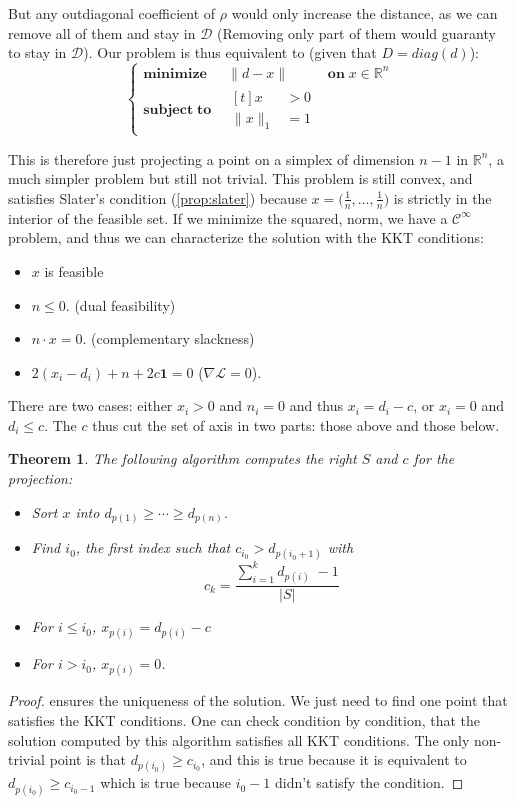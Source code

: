 \documentclass[10pt]{report}
\theoremstyle{plain}
\newtheorem{thm}{Theorem}[chapter]
\theoremstyle{definition}
\theoremstyle{remark}
\newcommand{\R}{\ensuremath{\mathbb{R}}}
\renewcommand{\geq}{\geqslant}
\renewcommand{\leq}{\leqslant}
\newcommand{\class}[1]{{\mathscr{C}^{#1}}}
\newcommand{\minima}[3]{\begin{cases}
    \mathbf{minimize}\;\,\quad #1& \mathbf{on}\; #2\\
    \mathbf{subject\;to}\quad \begin{aligned}[t]#3\end{aligned}
  \end{cases}}
\begin{document}
But any outdiagonal coefficient of $\rho$ would only increase the distance, as
we can remove all of them and stay in $\mathcal{D}$ (Removing only part of them
would guaranty to stay in $\mathcal{D}$). Our problem is thus equivalent to
(given that $D = diag(d)$):
\[\minima{\|d - x\|}{x \in\R^n}{ x&>0\\ \|x\|_1 &= 1}\]

This is therefore just projecting a point on a simplex of dimension $n-1$ in
$\R^n$, a much simpler problem but still not trivial. This problem is still
convex, and satisfies Slater's condition (\ref{prop:slater}) because $x = \big(\frac1n,\ldots,\frac1n\big)$
is strictly in the interior of the feasible set. If we minimize the squared,
norm, we have a $\class \infty$ problem, and thus we can characterize the
solution with the KKT conditions:
\begin{itemize}
\item $x$ is feasible
\item $n \leq 0$. (dual feasibility)
\item $n \cdot x = 0$. (complementary slackness)
\item $\displaystyle 2(x_i-d_i) + n + 2c \mathbf 1 = 0$ ($\nabla \mathcal{L} = 0$).
\end{itemize}

There are two cases: either $x_i > 0$ and $n_i = 0$ and thus $x_i = d_i - c$, or
$x_i = 0$ and $d_i \leq c$. The $c$ thus cut the set of axis in two parts: those above
and those below.

\begin{thm}
  The following algorithm computes the right $S$ and $c$ for the projection:
\begin{itemize}
\item Sort $x$ into $d_{p(1)} \geq \cdots \geq d_{p(n)}$.
\item Find $i_0$, the first index such that $c_{i_0} > d_{p(i_0+1)}$ with
  \[c_k = \frac{\sum\limits_{i = 1}^{k}\! d_{p(i)}\; -1}{|S|}\]
\item For $i \leq i_0$, $x_{p(i)} = d_{p(i)} - c$
\item For $i > i_0$, $x_{p(i)} = 0$.
\end{itemize}
\end{thm}

\begin{proof}
   ensures the uniqueness of the solution. We just need to
  find one point that satisfies the KKT conditions. One can check condition by
  condition, that the solution computed by this algorithm satisfies all KKT
  conditions. The only non-trivial point is that $d_{p(i_0)} \geq c_{i_0}$, and
  this is true because it is equivalent to $d_{p(i_0)} \geq c_{i_0 -1}$ which is
  true because $i_0 -1$ didn't satisfy the condition.
\end{proof}
\end{document}
